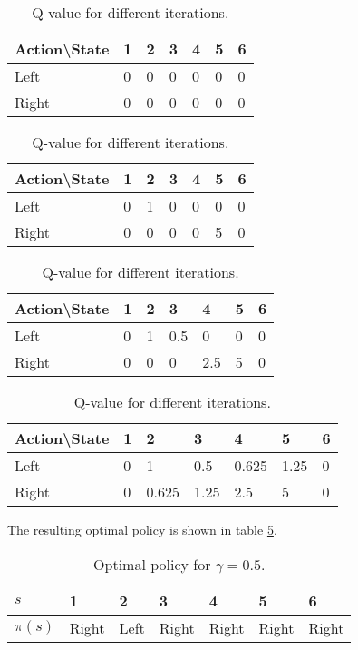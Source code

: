 \documentclass [a4paper] {report}
\begin{document}
	\begin{table}[H]
		\centering
		\caption{Q-value for different iterations.}
		\label{Qtable}
		\begin{tabular}{l|llllll}
			Action\textbackslash State    & 1 & 2 & 3 & 4 & 5 & 6 \\ \hline
			Left 				& 0 & 0 & 0 & 0 & 0 & 0 \\ 
			Right 			& 0 & 0 & 0 & 0 & 0 & 0 \\ 
		\end{tabular}
		
		\begin{tabular}{l|llllll}
			Action\textbackslash State    & 1 & 2 & 3 & 4 & 5 & 6 \\ \hline
			Left 				& 0 & 1 & 0 & 0 & 0 & 0 \\ 
			Right 			& 0 & 0 & 0 & 0 & 5 & 0 \\ 
		\end{tabular}
		
		\begin{tabular}{l|llllll}
			Action\textbackslash State    & 1 & 2 & 3 & 4 & 5 & 6 \\ \hline
			Left 				& 0 & 1 & 0.5 & 0 & 0 & 0 \\ 
			Right 			& 0 & 0 & 0 & 2.5 & 5 & 0 \\ 
		\end{tabular}
		
		\begin{tabular}{l|llllll}
			Action\textbackslash State    & 1 & 2 & 3 & 4 & 5 & 6 \\ \hline
			Left 				& 0 & 1 & 0.5 & 0.625 & 1.25 & 0 \\ 
			Right 			& 0 & 0.625 & 1.25 & 2.5 & 5 & 0 \\ 
		\end{tabular}
		
	\end{table}
	
	\noindent
	The resulting optimal policy is shown in table \ref{optPolicy}.
	
	\begin{table}[H]
		\centering
		\caption{Optimal policy for $\gamma=0.5$.}
		\label{optPolicy}
		\begin{tabular}{l|llllll}
			$s$    			& 1 & 2 & 3 & 4 & 5 & 6 \\ \hline
			$\pi(s)$			& Right & Left & Right & Right & Right & Right \\ 
		\end{tabular}
	\end{table}
	
\end{document}
